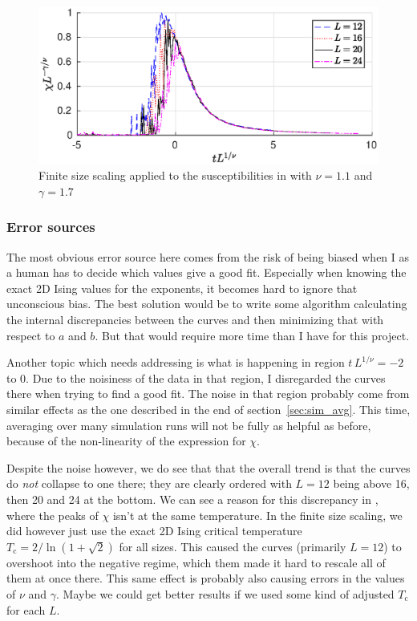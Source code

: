 \documentclass[11pt,letter, swedish, english
]{article}
\newcommand{\Tc}{\ensuremath{T_{\text{c}}}}
\begin{document}
\begin{figure}
\centering
\includegraphics[width=.9\textwidth]{finite-scaling_L-16--24_Nsteps-2048_Nmean-16.eps}
\caption{Finite size scaling applied to the susceptibilities in
   with $\nu=1.1$ and $\gamma=1.7$}
\label{fig:finite-scaling1}
\end{figure}

\subsubsection{Error sources}
The most obvious error source here comes from the risk of being
biased when I as a human has to decide which values give a good
fit. Especially when knowing the exact 2D Ising values for the
exponents, it becomes hard to ignore that unconscious bias. The best
solution would be to write some algorithm calculating the internal
discrepancies between the curves and then minimizing that with respect
to $a$ and $b$. But that would require more time than I have for this
project. 

Another topic which needs addressing is what is happening in region
$t\,L^{1/\nu}=-2$ to $0$. Due to the noisiness of the data in that
region, I disregarded the curves there when trying to find a good
fit. 
The noise in that region probably come from similar effects as the one 
described in the end of section~\ref{sec:sim_avg}. This time, averaging
over many simulation runs will not be fully as helpful as before,
because of the non-linearity of the expression for $\chi$.  

Despite the noise however, we do see that that the overall trend
is that the curves do \emph{not} collapse to one there; they are
clearly ordered with $L=12$ being above 16, then 20 and 24 at the
bottom. 
We can see a reason for this discrepancy in , where
the peaks of $\chi$ isn't at the same temperature. In the finite size
scaling, we did however just use the exact 2D Ising critical
temperature $\Tc=2/\ln(1+\sqrt2)$ for all sizes. This caused the
curves (primarily $L=12$) to overshoot into the negative regime, which
them made it hard to rescale all of them at once there. This same
effect is probably also causing errors in the values of $\nu$ and
$\gamma$. Maybe we could get better results if we used some kind of
adjusted $\Tc$ for each $L$. 
\end{document}
